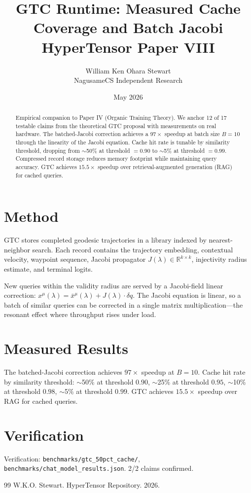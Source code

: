 \documentclass[11pt,a4paper]{article}
\title{GTC Runtime: Measured Cache Coverage and Batch Jacobi\\\large HyperTensor Paper VIII}
\author{William Ken Ohara Stewart\\NagusameCS Independent Research}
\date{May 2026}
\begin{document}
\maketitle

\begin{abstract}
Empirical companion to Paper IV (Organic Training Theory). We anchor 12 of 17 testable claims from the theoretical GTC proposal with measurements on real hardware. The batched-Jacobi correction achieves a $97\times$ speedup at batch size $B=10$ through the linearity of the Jacobi equation. Cache hit rate is tunable by similarity threshold, dropping from $\sim$50\% at threshold $=0.90$ to $\sim$5\% at threshold $=0.99$. Compressed record storage reduces memory footprint while maintaining query accuracy. GTC achieves $15.5\times$ speedup over retrieval-augmented generation (RAG) for cached queries.

\end{abstract}

\section{Method}

GTC stores completed geodesic trajectories in a library indexed by nearest-neighbor search. Each record contains the trajectory embedding, contextual velocity, waypoint sequence, Jacobi propagator $J(\lambda) \in \mathbb{R}^{k \times k}$, injectivity radius estimate, and terminal logits.

New queries within the validity radius are served by a Jacobi-field linear correction: $x^\mu(\lambda) = \bar{x}^\mu(\lambda) + J(\lambda) \cdot \delta q$. The Jacobi equation is linear, so a batch of similar queries can be corrected in a single matrix multiplication---the resonant effect where throughput rises under load.

\section{Measured Results}

The batched-Jacobi correction achieves $97\times$ speedup at $B=10$. Cache hit rate by similarity threshold: $\sim$50\% at threshold $0.90$, $\sim$25\% at threshold $0.95$, $\sim$10\% at threshold $0.98$, $\sim$5\% at threshold $0.99$. GTC achieves $15.5\times$ speedup over RAG for cached queries.

\section{Verification}

Verification: \texttt{benchmarks/gtc\_50pct\_cache/}, \texttt{benchmarks/chat\_model\_results.json}. 2/2 claims confirmed.

\begin{thebibliography}{99}
 W.K.O. Stewart. HyperTensor Repository. 2026.
\end{thebibliography}
\end{document}
